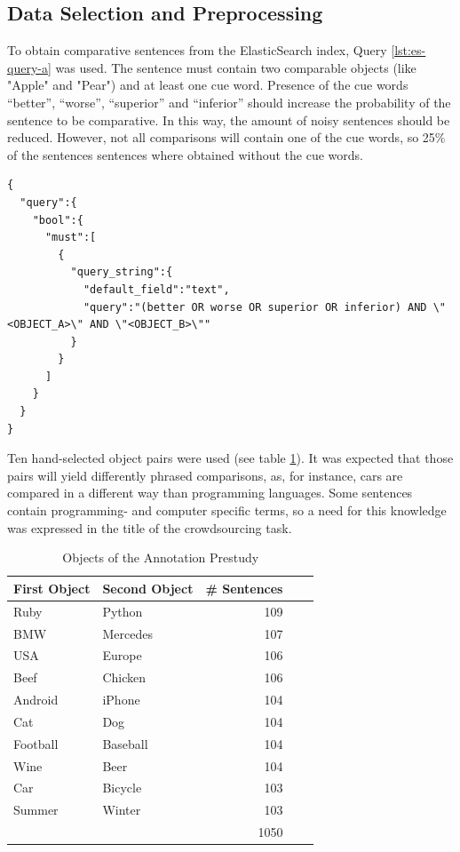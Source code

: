 \subsection{Data Selection and Preprocessing}
\label{sec:prestudy-processing}
To obtain comparative sentences from the ElasticSearch index, Query \ref{lst:es-query-a} was used. The sentence must contain two comparable objects (like "Apple" and "Pear") and at least one cue word. Presence of the cue words \enquote{better}, \enquote{worse}, \enquote{superior} and \enquote{inferior} should increase the probability of the sentence to be comparative. In this way, the amount of noisy sentences should be reduced.
However, not all comparisons will contain one of the cue words, so 25\% of the sentences sentences where obtained without the cue words.


\begin{lstlisting}[label=lst:es-query-a,breaklines=true,postbreak=\mbox{\textcolor{red}{$\hookrightarrow$}\space},caption=Prestudy Sentence Selection Query]
{
  "query":{
    "bool":{
      "must":[
        {
          "query_string":{
            "default_field":"text",
            "query":"(better OR worse OR superior OR inferior) AND \"<OBJECT_A>\" AND \"<OBJECT_B>\""
          }
        }
      ]
    }
  }
}
\end{lstlisting}



Ten hand-selected object pairs were used (see table \ref{tbl:prestudy-objects}). It was expected that those pairs will yield differently phrased comparisons, as, for instance, cars are compared in a different way than programming languages. Some sentences contain programming- and computer specific terms, so a need for this knowledge was expressed in the title of the crowdsourcing task.
\begin{table}[h]
\centering
\caption{Objects of the Annotation Prestudy}
\label{tbl:prestudy-objects}
\begin{tabular}{@{}llrrr@{}}
\toprule
First Object & Second Object      & \# Sentences                             \\ \midrule
Ruby    & Python    & 109      \\
BMW    & Mercedes    & 107  \\
USA & Europe & 106 \\
Beef & Chicken & 106   \\
Android & iPhone    &   104  \\
Cat & Dog      &     104  \\ 
Football & Baseball   &  104 \\ 
Wine & Beer  & 104  \\
Car & Bicycle & 103 \\
Summer & Winter &  103\\  \midrule 
 & & 1050 \\ 
\bottomrule  
                               
\end{tabular}
\end{table}

